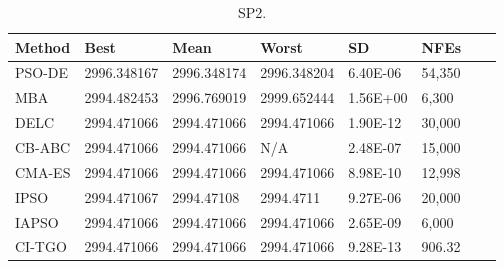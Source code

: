 
\begin{table*}[tp]
    \tiny
    \begin{center}
    
    \begin{tabular}{ P{2.0cm} P{2.0cm} P{2.0cm} P{2.0cm} P{2.0cm} P{2.0cm} P{2.0cm} P{2.0cm}  }
    \hline
    \textbf{Method} & \textbf{Best} & \textbf{Mean} & \textbf{Worst} & \textbf{SD} & \textbf{NFEs} \\
    \hline
    
    PSO-DE & 2996.348167 & 2996.348174 & 2996.348204 & 6.40E-06 & 54,350 \\
    MBA & 2994.482453 & 2996.769019 & 2999.652444 & 1.56E+00 & 6,300 \\
    DELC & 2994.471066 & 2994.471066 & 2994.471066 & 1.90E-12 & 30,000 \\
    CB-ABC & 2994.471066 & 2994.471066 & N/A & 2.48E-07 & 15,000 \\
    CMA-ES & 2994.471066 & 2994.471066 & 2994.471066 & 8.98E-10 & 12,998 \\
    IPSO & 2994.471067 & 2994.47108 & 2994.4711 & 9.27E-06 & 20,000 \\
    IAPSO & 2994.471066 & 2994.471066 & 2994.471066 & 2.65E-09 & 6,000 \\
    CI-TGO & 2994.471066 & 2994.471066 & 2994.471066 & 9.28E-13 & 906.32 \\ 
    
  

    \hline
    \end{tabular}
    \end{center}
    
    \caption{ SP2. \\[1em]}
    \label{tab:SP2}
    \end{table*}
    
    